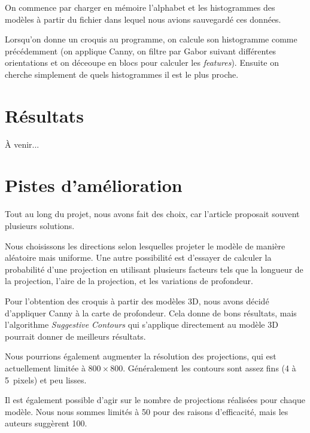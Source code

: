 \documentclass[12pt, a4paper, oneside]{article}
\begin{document}
On commence par charger en mémoire l'alphabet et les histogrammes des modèles à partir du fichier dans lequel nous avions sauvegardé ces données.

Lorsqu'on donne un croquis au programme, on calcule son histogramme comme précédemment (on applique Canny, on filtre par Gabor suivant différentes orientations et on déceoupe en blocs pour calculer les \emph{features}).
Ensuite on cherche simplement de quels histogrammes il est le plus proche.


\section{Résultats}

À venir...

\section{Pistes d'amélioration}

Tout au long du projet, nous avons fait des choix, car l'article proposait souvent plusieurs solutions.

Nous choisissons les directions selon lesquelles projeter le modèle de manière aléatoire mais uniforme.
Une autre possibilité est d'essayer de calculer la probabilité d'une projection en utilisant plusieurs facteurs tels que la longueur de la projection, l'aire de la projection, et les variations de profondeur.

Pour l'obtention des croquis à partir des modèles 3D, nous avons décidé d'appliquer Canny à la carte de profondeur.
Cela donne de bons résultats, mais l'algorithme \emph{Suggestive Contours} qui s'applique directement au modèle 3D pourrait donner de meilleurs résultats.

Nous pourrions également augmenter la résolution des projections, qui est actuellement limitée à $800 \times 800$.
Généralement les contours sont assez fins (4 à 5~pixels) et peu lisses.

Il est également possible d'agir sur le nombre de projections réalisées pour chaque modèle.
Nous nous sommes limités à 50 pour des raisons d'efficacité, mais les auteurs suggèrent 100.
\end{document}
